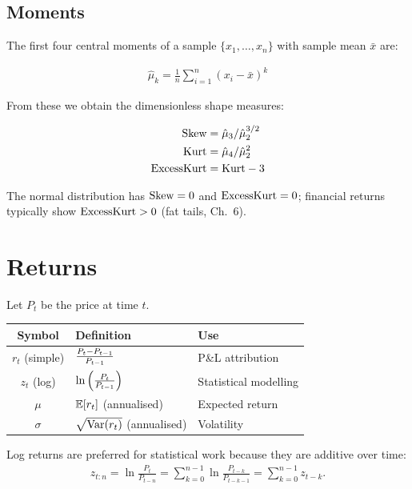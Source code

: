\subsection{Moments}

The first four central moments of a sample $\{x_1, \dots, x_n\}$ with
sample mean $\bar{x}$ are:

\begin{align}
\hat{\mu}_k = \frac{1}{n} \sum_{i=1}^{n} (x_i - \bar{x})^k
\end{align}

From these we obtain the dimensionless shape measures:

\begin{align}
\text{Skew} &= \hat{\mu}_3 / \hat{\mu}_2^{3/2} \\
\text{Kurt} &= \hat{\mu}_4 / \hat{\mu}_2^{2} \\
\text{ExcessKurt} &= \text{Kurt} - 3
\end{align}

The normal distribution has $\text{Skew} = 0$ and $\text{ExcessKurt} = 0$; financial
returns typically show $\text{ExcessKurt} > 0$ (fat tails, Ch.~6).

\section{Returns}

Let $P_t$ be the price at time $t$.

\begin{center}
\begin{tabular}{cll}
\toprule
\textbf{Symbol} & \textbf{Definition} & \textbf{Use} \\
\midrule
$r_t$ (simple) & $\frac{P_t - P_{t-1}}{P_{t-1}}$ & P\&L attribution \\
$z_t$ (log) & $\ln\left(\frac{P_t}{P_{t-1}}\right)$ & Statistical modelling \\
$\mu$ & $\mathbb{E}[r_t]$ (annualised) & Expected return \\
$\sigma$ & $\sqrt{\text{Var}(r_t)}$ (annualised) & Volatility \\
\bottomrule
\end{tabular}
\end{center}


Log returns are preferred for statistical work because they are
additive over time:
\begin{align}
z_{t:n} = \ln\frac{P_t}{P_{t-n}} = \sum_{k=0}^{n-1} \ln\frac{P_{t-k}}{P_{t-k-1}} = \sum_{k=0}^{n-1} z_{t-k}.
\end{align}

